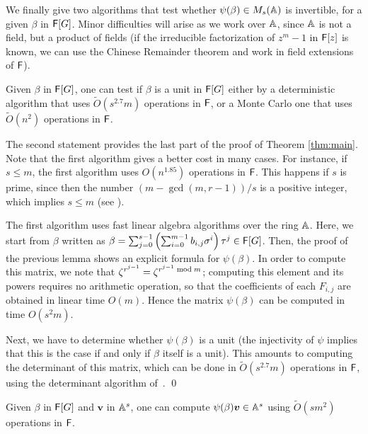 We finally give two algorithms that test whether $\psi(\beta) \in
M_s(\mathbb{A})$ is invertible, for a given $\beta$ in ${\mathsf{F}}[G]$. Minor
difficulties will arise as we work over $\mathbb{A}$, since $\mathbb{A}$ is not a
field, but a product of fields (if the irreducible factorization of
$z^m-1$ in ${\mathsf{F}}[z]$ is known, we can use the Chinese Remainder theorem
and work in field extensions of ${\mathsf{F}}$).

\begin{corollary}\label{coro:test_meta}
  Given $\beta$ in ${\mathsf{F}}[G]$, one can test if $\beta$ is a unit in
  ${\mathsf{F}}[G]$ either by a deterministic algorithm that uses
  $\tilde{O}(s^{2.7} m)$ operations in ${\mathsf{F}}$, or a Monte Carlo one that
  uses $\tilde{O}(n^2)$ operations in ${\mathsf{F}}$.
\end{corollary}
The second statement provides the last part of the proof of Theorem
\ref{thm:main}. Note that the first algorithm gives a better cost in
many cases. For instance, if $s \leq m$, the first algorithm uses
$O(n^{1.85})$ operations in ${\mathsf{F}}$. This happens if $s$ is prime, since
then the number ${(m- \gcd(m,r-1))}/{s}$ is a positive integer,
which implies $s \leq m$ (see \cite[Theorem 47.12, Corollary 47.14
]{Curtis}).


  The first algorithm uses fast linear algebra algorithms over the ring
  $\mathbb{A}$. Here, we start from $\beta$ written as $\beta = \sum_{j =
    0}^{s-1} \left( \sum_{i = 0}^{m-1} b_{i,j} \sigma^i \right) \tau^j
  \in {\mathsf{F}}[G]$. Then, the proof of the previous lemma shows an explicit
  formula for $\psi(\beta)$. In order to compute this matrix, we note
  that $\zeta^{r^{j-1}} = \zeta^{r^{j-1} \bmod m}$; computing this
  element and its powers requires no arithmetic operation, so that the
  coefficients of each $F_{i,j}$ are obtained in linear time $O(m)$.
  Hence the matrix $\psi(\beta)$ can be computed in time $O(s^2m)$.

  Next, we have to determine whether $\psi(\beta)$ is a unit (the
  injectivity of $\psi$ implies that this is the case if and only if
  $\beta$ itself is a unit). This amounts to computing the determinant
  of this matrix, which can be done in $\tilde{O}(s^{2.7} m)$
  operations in ${\mathsf{F}}$, using the determinant algorithm
  of~\cite[Section~6]{KaVi04}. \qed



\begin{lemma}\label{lem:multpsi}
  Given $\beta$ in ${\mathsf{F}}[G]$ and $\boldsymbol{v}$ in $\mathbb{A}^s$, one can
  compute $\psi(\beta) \boldsymbol{v} \in \mathbb{A}^s$ using $\tilde{O}(s
  m^2)$ operations in ${\mathsf{F}}$.
\end{lemma}


